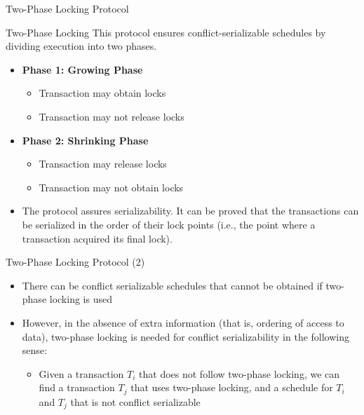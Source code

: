 \documentclass[aspectratio=169, xcolor=dvipsnames]{beamer}
\begin{document}
\begin{frame}{Two-Phase Locking Protocol}
    \begin{block}{Two-Phase Locking}
        This protocol ensures conflict-serializable schedules by dividing execution into two phases.
    \end{block}
    \begin{itemize}[<+->]
        \item \textbf{Phase 1: Growing Phase}
        \begin{itemize}
            \item[$\triangleright$] Transaction may obtain locks
            \item[$\triangleright$] Transaction may not release locks
        \end{itemize}
        \item \textbf{Phase 2: Shrinking Phase}
        \begin{itemize}
            \item[$\triangleright$] Transaction may release locks
            \item[$\triangleright$] Transaction may not obtain locks
        \end{itemize}
        \item The protocol assures serializability. It can be proved that the transactions can be serialized in the order of their lock points (i.e., the point where a transaction acquired its final lock).
    \end{itemize}
\end{frame}

\begin{frame}{Two-Phase Locking Protocol (2)}
    \begin{itemize}[<+->]
        \item There can be conflict serializable schedules that cannot be obtained if two-phase locking is used
        \item However, in the absence of extra information (that is, ordering of access to data), two-phase locking is needed for conflict serializability in the following sense:
        \begin{itemize}
            \item[$\triangleright$] Given a transaction $T_i$ that does not follow two-phase locking, we can find a transaction $T_j$ that uses two-phase locking, and a schedule for $T_i$ and $T_j$ that is not conflict serializable
        \end{itemize}
    \end{itemize}
\end{frame}
\end{document}
